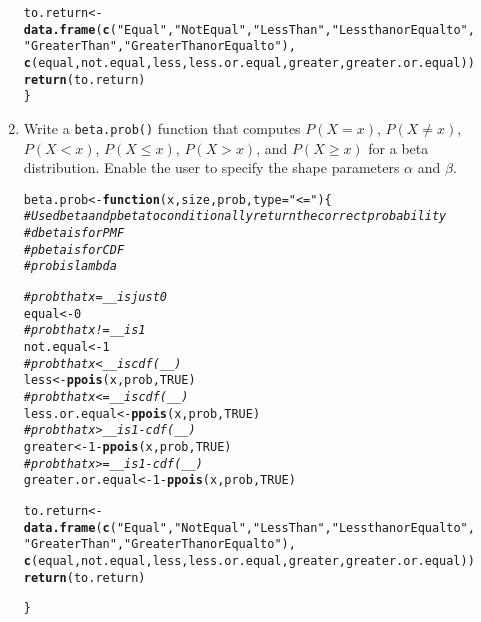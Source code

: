 \documentclass{article}\usepackage[]{graphicx}\usepackage[]{xcolor}
\makeatletter
\newcommand{\hlnum}[1]{\textcolor[rgb]{0.686,0.059,0.569}{#1}}%
\newcommand{\hlsng}[1]{\textcolor[rgb]{0.192,0.494,0.8}{#1}}%
\newcommand{\hlcom}[1]{\textcolor[rgb]{0.678,0.584,0.686}{\textit{#1}}}%
\newcommand{\hlopt}[1]{\textcolor[rgb]{0,0,0}{#1}}%
\newcommand{\hldef}[1]{\textcolor[rgb]{0.345,0.345,0.345}{#1}}%
\newcommand{\hlkwa}[1]{\textcolor[rgb]{0.161,0.373,0.58}{\textbf{#1}}}%
\newcommand{\hlkwb}[1]{\textcolor[rgb]{0.69,0.353,0.396}{#1}}%
\newcommand{\hlkwc}[1]{\textcolor[rgb]{0.333,0.667,0.333}{#1}}%
\newcommand{\hlkwd}[1]{\textcolor[rgb]{0.737,0.353,0.396}{\textbf{#1}}}%
\newenvironment{kframe}{%
 \def\at@end@of@kframe{}%
 \ifinner\ifhmode%
  \def\at@end@of@kframe{\end{minipage}}%
  \begin{minipage}{\columnwidth}%
 \fi\fi%
 \def\FrameCommand##1{\hskip\@totalleftmargin \hskip-\fboxsep
 \colorbox{shadecolor}{##1}\hskip-\fboxsep
     \hskip-\linewidth \hskip-\@totalleftmargin \hskip\columnwidth}%
 \MakeFramed {\advance\hsize-\width
   \@totalleftmargin\z@ \linewidth\hsize
   \@setminipage}}%
 {\par\unskip\endMakeFramed%
 \at@end@of@kframe}
\newenvironment{knitrout}{}{} %
\makeatother
\begin{document}
\begin{enumerate}
\begin{knitrout}
\begin{kframe}
\begin{alltt}
  \hldef{to.return} \hlkwb{<-} \hlkwd{data.frame}\hldef{(}\hlkwd{c}\hldef{(}\hlsng{"Equal"}\hldef{,} \hlsng{"Not Equal"}\hldef{,} \hlsng{"Less Than"}\hldef{,} \hlsng{"Less than or Equal to"}\hldef{,}
                            \hlsng{"Greater Than"}\hldef{,} \hlsng{"Greater Than or Equal to"}\hldef{),}
                          \hlkwd{c}\hldef{(equal,not.equal,less,less.or.equal,greater,greater.or.equal))}
  \hlkwd{return}\hldef{(to.return)}
\hldef{\}}
\end{alltt}
\end{kframe}
\end{knitrout}
    \item Write a \texttt{beta.prob()} function that computes $P(X=x)$, 
    $P(X \neq x)$, $P(X<x)$, $P(X \leq x)$, $P(X > x)$, and $P(X \geq x)$
    for a beta distribution. Enable the user to specify the shape parameters
    $\alpha$ and $\beta$.
\begin{knitrout}\scriptsize
{}\color{fgcolor}\begin{kframe}
\begin{alltt}
\hldef{beta.prob} \hlkwb{<-} \hlkwa{function}\hldef{(}\hlkwc{x}\hldef{,} \hlkwc{size}\hldef{,} \hlkwc{prob}\hldef{,} \hlkwc{type}\hldef{=}\hlsng{"<="}\hldef{)\{}
  \hlcom{# Use dbeta and pbeta to conditionally return the correct probability}
  \hlcom{#dbeta is for PMF}
  \hlcom{#pbeta is for CDF}
  \hlcom{# prob is lambda}

  \hlcom{#prob that x=__ is just 0}
  \hldef{equal} \hlkwb{<-}\hlnum{0}
  \hlcom{#prob that x!=__ is 1}
  \hldef{not.equal} \hlkwb{<-} \hlnum{1}
  \hlcom{#prob that x<__ is cdf(__)}
  \hldef{less} \hlkwb{<-} \hlkwd{ppois}\hldef{(x,prob,}\hlnum{TRUE}\hldef{)}
  \hlcom{#prob that x <= __ is cdf(__)}
  \hldef{less.or.equal} \hlkwb{<-} \hlkwd{ppois}\hldef{(x,prob,}\hlnum{TRUE}\hldef{)}
  \hlcom{#prob that x> __ is 1-cdf(__)}
  \hldef{greater} \hlkwb{<-} \hlnum{1}\hlopt{-} \hlkwd{ppois}\hldef{(x,prob,}\hlnum{TRUE}\hldef{)}
  \hlcom{#prob that x>= __ is 1-cdf(__)}
  \hldef{greater.or.equal} \hlkwb{<-} \hlnum{1}\hlopt{-}\hlkwd{ppois}\hldef{(x,prob,}\hlnum{TRUE}\hldef{)}

  \hldef{to.return} \hlkwb{<-} \hlkwd{data.frame}\hldef{(}\hlkwd{c}\hldef{(}\hlsng{"Equal"}\hldef{,} \hlsng{"Not Equal"}\hldef{,} \hlsng{"Less Than"}\hldef{,} \hlsng{"Less than or Equal to"}\hldef{,}
                            \hlsng{"Greater Than"}\hldef{,} \hlsng{"Greater Than or Equal to"}\hldef{),}
                          \hlkwd{c}\hldef{(equal,not.equal,less,less.or.equal,greater,greater.or.equal))}
  \hlkwd{return}\hldef{(to.return)}

\hldef{\}}
\end{alltt}
\end{kframe}
\end{knitrout}
\end{enumerate}

\end{document}
